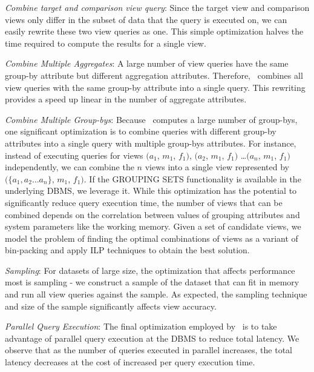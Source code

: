 \begin{denselist}
  \item {\it Combine target and comparison view query}: Since the target view
  and comparison views only differ in the subset of data that the query is
  executed on, we can easily rewrite these two view queries as one.
  This simple optimization halves the time required to compute the results for
  a single view.
  \item {\it Combine Multiple Aggregates}: A large number of view
  queries have the same group-by attribute but different aggregation attributes.
  Therefore, \SeeDB\ combines all view queries with the same group-by attribute
  into a single query. This rewriting provides a speed up linear in the
  number of aggregate attributes.
  \item {\it Combine Multiple Group-bys}: 
  Because \SeeDB\ computes a large number of group-bys, one significant
  optimization is to combine queries with different
  group-by attributes into a single query with multiple group-bys attributes.
  For instance, instead of executing queries for views $(a_1$, $m_1$, $f_1)$,
  $(a_2$, $m_1$, $f_1)$ \ldots $(a_n$, $m_1$, $f_1)$ independently, we can combine the $n$ views into a single view represented by
  $(\{a_1, a_2\ldots a_n\}$, $m_1$, $f_1)$. 
  If the GROUPING SETS functionality is available in
  the underlying DBMS, we leverage it. 
  While this optimization has the potential to significantly reduce query
  execution time, the number of views that can be combined depends
  on the correlation between values of grouping attributes and system parameters like the
  working memory. Given a set of candidate views, we model the
  problem of finding the optimal combinations of views as a variant of bin-packing and apply ILP techniques to obtain the best solution. 
  \item {\it Sampling}: For datasets of large size, the optimization that
  affects performance most is sampling - we construct a sample of the dataset
  that can fit in memory and run all view queries against the sample. As
  expected, the sampling technique and size of the sample significantly affects
  view accuracy. 
  \item {\it Parallel Query Execution}: The final optimization employed by
  \SeeDB\ is to take advantage of parallel query execution at the DBMS to reduce
  total latency.
  We observe that as the number of queries executed in parallel
  increases, the total latency decreases at the cost of
  increased per query execution time.
\end{denselist}
